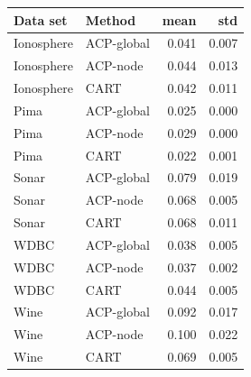 \begin{tabular}{llrr}
\toprule
Data set & Method & mean & std \\
\midrule
Ionosphere & ACP-global & 0.041 & 0.007 \\
Ionosphere & ACP-node & 0.044 & 0.013 \\
Ionosphere & CART & 0.042 & 0.011 \\
Pima & ACP-global & 0.025 & 0.000 \\
Pima & ACP-node & 0.029 & 0.000 \\
Pima & CART & 0.022 & 0.001 \\
Sonar & ACP-global & 0.079 & 0.019 \\
Sonar & ACP-node & 0.068 & 0.005 \\
Sonar & CART & 0.068 & 0.011 \\
WDBC & ACP-global & 0.038 & 0.005 \\
WDBC & ACP-node & 0.037 & 0.002 \\
WDBC & CART & 0.044 & 0.005 \\
Wine & ACP-global & 0.092 & 0.017 \\
Wine & ACP-node & 0.100 & 0.022 \\
Wine & CART & 0.069 & 0.005 \\
\bottomrule
\end{tabular}
